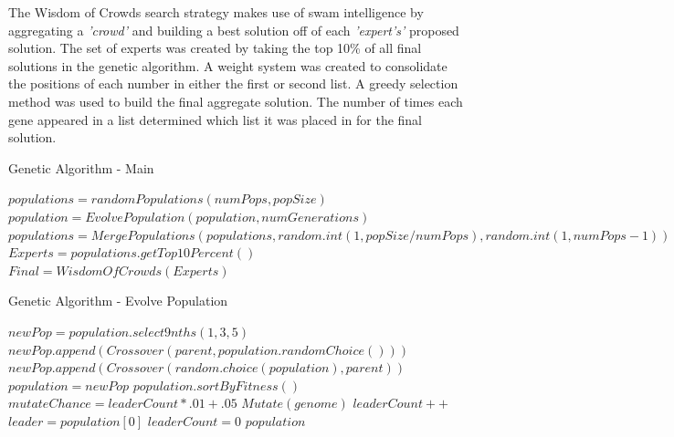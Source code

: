 \documentclass{article}
\begin{document}
The Wisdom of Crowds search strategy makes use of swam intelligence by aggregating a \emph{'crowd'} and building a best solution off of each \emph{'expert's'} proposed solution. The set of experts was created by taking the top 10\% of all final solutions in the genetic algorithm. A weight system was created to consolidate the positions of each number in either the first or second list. A greedy selection method was used to build the final aggregate solution. The number of times each gene appeared in a list determined which list it was placed in for the final solution.

\begin{algorithm}
\caption{Genetic Algorithm - Main}
\begin{algorithmic}

\State $populations = randomPopulations(numPops, popSize)$
		\State $population = EvolvePopulation(population, numGenerations)$
	\EndFor
	\State $populations = MergePopulations(populations, random.int(1, popSize/numPops), random.int(1, numPops-1))$
\EndFor
\State $Experts = populations.getTop10Percent()$
\State $Final = WisdomOfCrowds(Experts)$
\end{algorithmic}
\end{algorithm}

\begin{algorithm}
\caption{Genetic Algorithm - Evolve Population}
\begin{algorithmic}
		\State $newPop = population.select9nths(1,3,5)$
			\State $newPop.append(Crossover(parent, population.randomChoice()))$
			\State $newPop.append(Crossover(random.choice(population), parent))$
		\EndFor
		\State $population = newPop$
		\State $population.sortByFitness()$
		\State $mutateChance = leaderCount * .01 + .05$
				\State $Mutate(genome)$
			\EndIf
		\EndFor
			\State $leaderCount++$
		\Else 
			\State $leader = population[0]$
			\State $leaderCount = 0$
		\EndIf
	\EndFor
	\State\Return $population$
\EndFunction
\end{algorithmic}
\end{algorithm}
\end{document}
